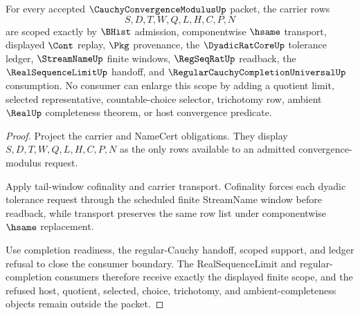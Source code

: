 \begin{theorem}
\label{thm:cauchy-convergence-modulus-scope-binding}
For every accepted $\CauchyConvergenceModulusUp$ packet, the carrier rows
$$
S,D,T,W,Q,L,H,C,P,N
$$
are scoped exactly by $\BHist$ admission, componentwise $\hsame$ transport, displayed $\Cont$ replay, $\Pkg$ provenance, the $\DyadicRatCoreUp$ tolerance ledger, $\StreamNameUp$ finite windows, $\RegSeqRatUp$ readback, the $\RealSequenceLimitUp$ handoff, and $\RegularCauchyCompletionUniversalUp$ consumption. No consumer can enlarge this scope by adding a quotient limit, selected representative, countable-choice selector, trichotomy row, ambient $\RealUp$ completeness theorem, or host convergence predicate.
\end{theorem}
\begin{proof}
Project the carrier and NameCert obligations. They display $S,D,T,W,Q,L,H,C,P,N$ as the only rows available to an admitted convergence-modulus request.

Apply tail-window cofinality and carrier transport. Cofinality forces each dyadic tolerance request through the scheduled finite StreamName window before readback, while transport preserves the same row list under componentwise $\hsame$ replacement.

Use completion readiness, the regular-Cauchy handoff, scoped support, and ledger refusal to close the consumer boundary. The RealSequenceLimit and regular-completion consumers therefore receive exactly the displayed finite scope, and the refused host, quotient, selected, choice, trichotomy, and ambient-completeness objects remain outside the packet.
\end{proof}

